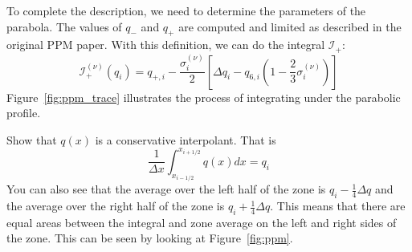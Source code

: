 To complete the description, we need to determine the parameters of
the parabola.  The values of $q_-$ and $q_+$ are computed and limited
as described in the original PPM paper.  With this definition, we can
do the integral $\mathcal{I}_+$:
\begin{equation}
\mathcal{I}_+^{(\nu)}(q_i) = q_{+,i} - \frac{\sigma_i^{(\nu)}}{2}
   \left [ \Delta q_i - q_{6,i} \left ( 1 - \frac{2}{3} \sigma_i^{(\nu)} \right ) \right ]
\end{equation}
Figure~\ref{fig:ppm_trace} illustrates the process of integrating under
the parabolic profile.


\begin{exercise}
{Show that $q(x)$ is a conservative interpolant.  That is
\begin{equation}
\frac{1}{\Delta x} \int_{x_{i-1/2}}^{x_{i+1/2}} q(x) dx = q_i
\end{equation}
You can also see that the average over the left half of the zone is
$q_i -\frac{1}{4}\Delta q$ and the average over the right half of the
zone is $q_i + \frac{1}{4}\Delta q$.  This means that there are equal
areas between the integral and zone average on the left and right
sides of the zone.  This can be seen by looking at
Figure~\ref{fig:ppm}.  }
\end{exercise}

